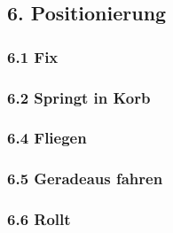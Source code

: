 \subsection{6. Positionierung}

\subsubsection{6.1 Fix}

\subsubsection{6.2 Springt in Korb}

\subsubsection{6.4 Fliegen}

\subsubsection{6.5 Geradeaus fahren}

\subsubsection{6.6 Rollt}
